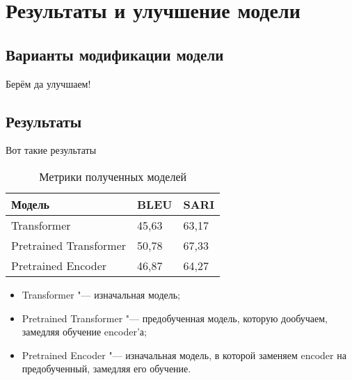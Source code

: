 

\chapter{Результаты и улучшение модели}


\section{Варианты модификации модели}


Берём да улучшаем!


\section{Результаты}


Вот такие результаты

\begin{table}[H]%
  \centering\small
  \caption{Метрики полученных моделей}
  \label{metrics}
    \begin{tabular}{|l|l|l|}
      \hline
      \textbf{Модель} & \textbf{BLEU} & \textbf{SARI} \\ \hline
      Transformer & 45{,}63 & 63{,}17 \\ \hline
      Pretrained Transformer & 50{,}78 & 67{,}33 \\ \hline
      Pretrained Encoder & 46{,}87 & 64{,}27 \\ \hline
    \end{tabular}
    \normalsize
\end{table}

\begin{itemize}%
  \item Transformer "--- изначальная модель;
  \item Pretrained Transformer "--- предобученная модель, которую дообучаем, замедляя обучение encoder'а;
  \item Pretrained Encoder "--- изначальная модель, в которой заменяем encoder на предобученный, замедляя его обучение.
\end{itemize}
